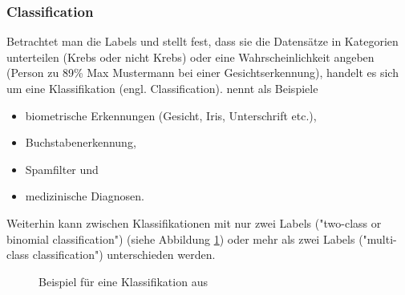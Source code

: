 \subsubsection{Classification} \label{subsubsec:classification}
Betrachtet man die Labels und stellt fest, dass sie die Datensätze in Kategorien unterteilen (Krebs oder nicht Krebs) oder eine Wahrscheinlichkeit angeben (Person zu 89\% Max Mustermann bei einer Gesichtserkennung), handelt es sich um eine Klassifikation (engl. Classification).\citep[S.~67]{swamynathan_mastering_2017} \citep[S.~5]{kauchak_zoterovoll2.pdf_2016} nennt als Beispiele
\begin{itemize}
\item biometrische Erkennungen (Gesicht, Iris, Unterschrift etc.),
\item Buchstabenerkennung,
\item Spamfilter und
\item medizinische Diagnosen.
\end{itemize}
Weiterhin kann zwischen Klassifikationen mit nur zwei Labels ("two-class or binomial classification"\citep{ericson_how_2017}) (siehe Abbildung \ref{fig:classification}) oder mehr als zwei Labels ("multi-class classification"\citep{ericson_how_2017}) unterschieden werden.
\begin{figure}[H]
\centering
{}
\caption{Beispiel für eine Klassifikation aus \citep[S.~8]{suthaharan_machine_2016}}
\label{fig:classification}
\end{figure}
